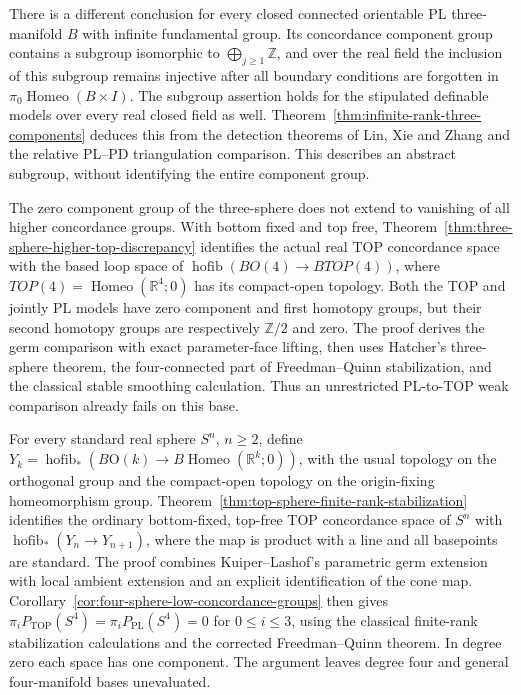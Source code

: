 \documentclass[11pt,a4paper]{article}
\theoremstyle{definition}
\begin{document}
There is a different conclusion for every closed connected orientable
PL three-manifold $B$ with infinite fundamental group. Its concordance
component group contains a subgroup isomorphic to
$\bigoplus_{j\geq1}\mathbb Z$, and over the real field the inclusion
of this subgroup remains injective after all boundary conditions are
forgotten in $\pi_0\operatorname{Homeo}(B\times I)$.
The subgroup assertion holds for the stipulated definable models over
every real closed field as well. Theorem~\ref{thm:infinite-rank-three-components}
deduces this from the detection theorems of Lin, Xie and Zhang
\cite[Theorems~C and~D, pp.~13 and~28]{LinXieZhang2026} and the
relative PL--PD triangulation comparison. This describes an abstract subgroup, without identifying the entire component group.

The zero component group of the three-sphere does not extend to
vanishing of all higher concordance groups. With bottom fixed and top
free, Theorem~\ref{thm:three-sphere-higher-top-discrepancy} identifies
the actual real TOP concordance space with the based loop space of
\(\operatorname{hofib}(BO(4)\to BTOP(4))\), where
\(TOP(4)=\operatorname{Homeo}(\mathbb R^4;0)\) has its compact-open
topology. Both the TOP and jointly PL models have zero component and
first homotopy groups, but their second homotopy groups are respectively
$\mathbb Z/2$ and zero. The proof derives the germ comparison with
exact parameter-face lifting, then uses Hatcher's three-sphere theorem,
the four-connected part of Freedman--Quinn stabilization, and the
classical stable smoothing calculation. Thus an unrestricted
PL-to-TOP weak comparison already fails on this base.

For every standard real sphere $S^n$, $n\geq2$, define
$Y_k=\operatorname{hofib}_*(B\mathrm O(k)\to
B\operatorname{Homeo}(\mathbb R^k;0))$, with the usual topology
on the orthogonal group and the compact-open topology on the
origin-fixing homeomorphism group. Theorem~\ref{thm:top-sphere-finite-rank-stabilization}
identifies the ordinary bottom-fixed, top-free TOP concordance
space of $S^n$ with $\operatorname{hofib}_*(Y_n\to Y_{n+1})$,
where the map is product with a line and all basepoints are standard.
The proof combines Kuiper--Lashof's parametric germ extension
\cite[Lemma~3, p.~11; proof, pp.~12--13]{KuiperLashof1966I}
with local ambient extension and an explicit identification of
the cone map. Corollary~\ref{cor:four-sphere-low-concordance-groups}
then gives $\pi_iP_{\mathrm{TOP}}(S^4)=
\pi_iP_{\mathrm{PL}}(S^4)=0$ for $0\leq i\leq3$, using the
classical finite-rank stabilization calculations and the corrected
Freedman--Quinn theorem. In degree zero each space has one component.
The argument leaves degree four and general four-manifold bases
unevaluated.
\end{document}
